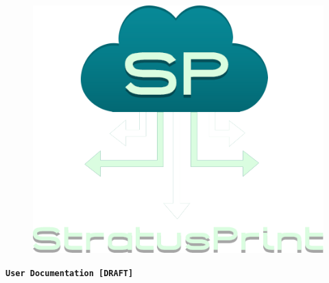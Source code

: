 \begin{titlepage}
\vspace*{\fill}
\pagecolor{titlepagecolor}
\color{white}

\begin{center}
\begin{figure}[!h]
   \centerline{\includegraphics[scale=0.6]{images/sp-logo-transparent}}
\end{figure}
\end{center}
\begin{center}

	\vspace{1.8em}

	\Huge\textbf{\texttt{User Documentation [DRAFT]}} \textcolor{titlepagecolor!20}{\textsf{}}
\end{center}

\vspace*{\fill}
\end{titlepage}